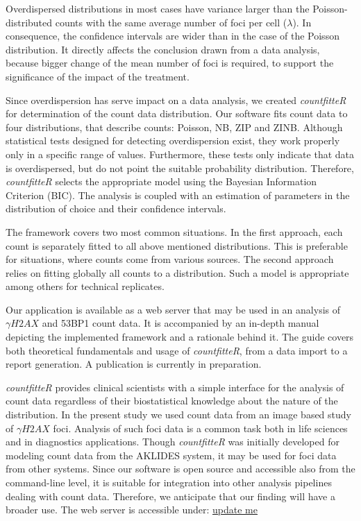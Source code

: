 Overdispersed distributions in most cases have variance larger than the 
Poisson-distributed counts with the same average number of foci per cell 
($\lambda$). In consequence, the confidence intervals are wider than in the case of 
the Poisson distribution. It directly affects the conclusion drawn from a data 
analysis, because bigger change of the mean number of foci is required, to 
support the significance of the impact of the treatment. 

Since overdispersion has serve impact on a data analysis, we created \emph{countfitteR} for 
determination of the count data distribution. Our software fits count data to 
four distributions, that describe counts: Poisson, NB, ZIP and ZINB. Although 
statistical tests designed for detecting overdispersion exist, they work 
properly only in a specific range of values. Furthermore, these tests only 
indicate that data is overdispersed, but do not point the suitable probability 
distribution. Therefore, \emph{countfitteR} selects the appropriate model using the Bayesian 
Information Criterion (BIC). The analysis is coupled with an estimation of 
parameters in the distribution of choice and their confidence intervals.  

The framework covers two most common situations. In the first approach, each 
count is separately fitted to all above mentioned distributions. This is 
preferable for situations, where counts come from various sources. The second 
approach relies on fitting globally all counts to a distribution. Such a model 
is appropriate among others for technical replicates.  

Our application is available as a web server that may be used in an 
analysis of $\gamma H2AX$ and 53BP1 count data. It is accompanied by 
an in-depth manual depicting the implemented framework and a rationale behind 
it. The guide covers both theoretical fundamentals and usage of \emph{countfitteR}, from a 
data import to a report generation. A publication is currently in preparation.

\emph{countfitteR} provides clinical scientists with a simple interface for the analysis of 
count data regardless of their biostatistical knowledge about the nature of the 
distribution. In the present study we used count data from an image based study 
of $\gamma H2AX$ foci. Analysis of such foci data is a common task both in life 
sciences and in diagnostics applications. Though \emph{countfitteR} was initially developed 
for modeling count data from the AKLIDES system, it may be used for foci 
data from other systems. Since our software is open source and accessible also 
from the command-line level, it is suitable for integration into other analysis 
pipelines dealing with count data. Therefore, we anticipate that our finding 
will have a broader use. The web server is accessible under: 
\url{update me}


